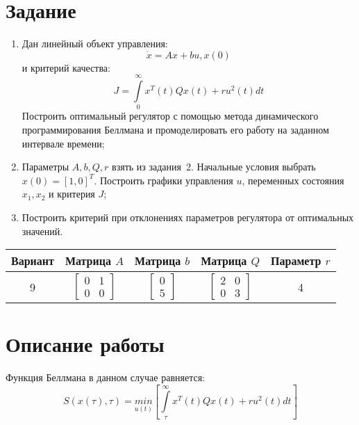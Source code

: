 \documentclass[14pt, a4paper]{extarticle}
\begin{document}
	\onehalfspacing
	
	\setcounter{page}{2}
	
	\section*{Задание}
	
	\begin{enumerate}
		\item Дан линейный объект управления:
		$$\dot{x}=Ax+bu, x(0)$$
		и критерий качества:
		$$J = \int\limits_0^\infty x^T(t)Qx(t) + ru^2(t)dt$$
		Построить оптимальный регулятор с помощью метода динамического программирования Беллмана и промоделировать его работу на заданном интервале времени;
		\item Параметры $A,b,Q,r$ взять из задания~2. Начальные условия выбрать $x(0)=[1, 0]^T$. Построить графики управления $u$, переменных состояния $x_1,x_2$ и критерия $J$;
		\item Построить критерий при отклонениях параметров регулятора от оптимальных значений.
	\end{enumerate}
	\begin{table}[H]
		\centering
		\begin{tabular}{|c|c|c|c|c|}
			\hline
			Вариант & Матрица $A$ & Матрица $b$ & Матрица $Q$ & Параметр $r$ \\\hline
			9 & 
			$\left[
			\begin{matrix}
				0 & 1 \\
				0 & 0 
			\end{matrix}
			\right]$
			& 
			$\left[
			\begin{matrix}
				0 \\ 5
			\end{matrix}
			\right]$
			& 
			$\left[
			\begin{matrix}
				2 & 0 \\
				0 & 3 
			\end{matrix}
			\right]$
			& 4 \\\hline
		\end{tabular}
	\end{table}
	
	\newpage
	
	\section*{Описание работы}
	
	Функция Беллмана в данном случае равняется:
	$$S(x(\tau),\tau) = \underset{u(t)}{min}\left[\int\limits_\tau^\infty x^T(t)Qx(t) + ru^2(t)dt\right]$$
	
\end{document}
